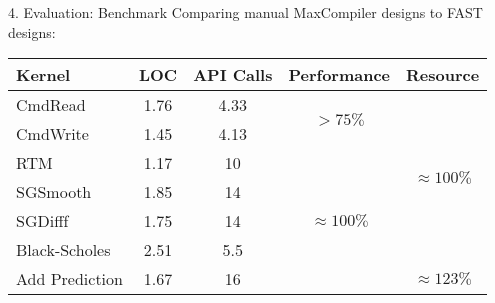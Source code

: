 \begin{comment}
\begin{frame}{4. Evaluation: Reverse Time Migration}
  \begin{table}
  \end{table}
\end{frame}
\end{comment}

\begin{frame}{4. Evaluation: Benchmark}
  Comparing manual MaxCompiler designs to FAST designs:
{\footnotesize
  \begin{table}
    \renewcommand{\arraystretch}{1.5}
    \begin{tabular}{l|c|c|c|c}
      \textbf{Kernel} & \textbf{LOC} & \textbf{API Calls} & \textbf{Performance}              & \textbf{Resource}
      \\
      \hline\hline
      CmdRead         & 1.76               & 4.33                     & \multirow{2}{1.5cm}{$ > 75\%$}        & \multirow{6}{1.5cm}{$\approx 100\%$} \\
      CmdWrite        & 1.45               & 4.13                     &                                   &                              \\
      \cline{1-4}
      RTM             & 1.17               & 10                       & \multirow{5}{1.5cm}{$ \approx 100\%$} &                              \\
      SGSmooth        & 1.85               & 14                       &                                   &                              \\
      SGDifff         & 1.75               & 14                       &                                   &                              \\
      Black-Scholes   & 2.51               & 5.5                      &                                   &                              \\
      \cline{5-5}
      Add Prediction  & 1.67               & 16                       &                                   &    $ \approx 123 \% $                          \\
    \end{tabular}
  \end{table}}

\end{frame}